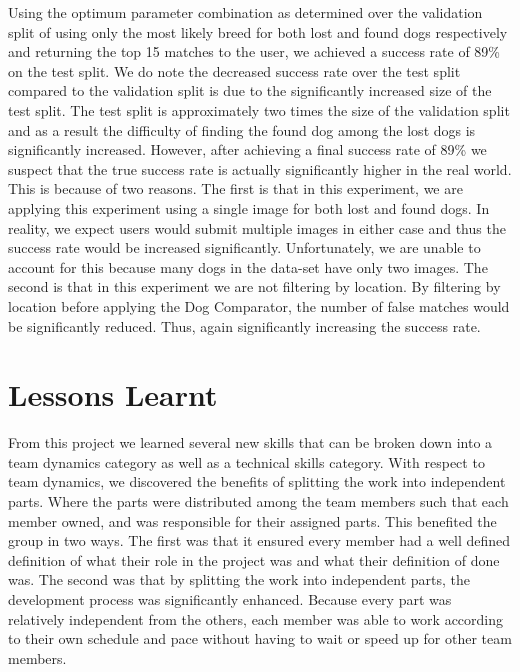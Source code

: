 \documentclass{article}
\begin{document}
Using the optimum parameter combination as determined over the validation split of using only the most likely breed for both lost and found dogs respectively and returning the top 15 matches to the user, we achieved a success rate of 89\% on the test split.  We do note the decreased success rate over the test split compared to the validation split is due to the significantly increased size of the test split.  The test split is approximately two times the size of the validation split and as a result the difficulty of finding the found dog among the lost dogs is significantly increased.  However, after achieving a final success rate of 89\% we suspect that the true success rate is actually significantly higher in the real world.  This is because of two reasons.  The first is that in this experiment, we are applying this experiment using a single image for both lost and found dogs.  In reality, we expect users would submit multiple images in either case and thus the success rate would be increased significantly.  Unfortunately, we are unable to account for this because many dogs in the data-set have only two images.  The second is that in this experiment we are not filtering by location.  By filtering by location before applying the Dog Comparator, the number of false matches would be significantly reduced.  Thus, again significantly increasing the success rate.

\newpage

\section{Lessons Learnt}
From this project we learned several new skills that can be broken down into a team dynamics category as well as a technical skills category.  With respect to team dynamics, we discovered the benefits of splitting the work into independent parts.  Where the parts were distributed among the team members such that each member owned, and was responsible for their assigned parts.  This benefited the group in two ways.  The first was that it ensured every member had a well defined definition of what their role in the project was and what their definition of done was.  The second was that by splitting the work into independent parts, the development process was significantly enhanced.  Because every part was relatively independent from the others, each member was able to work according to their own schedule and pace without having to wait or speed up for other team members.  
\end{document}
